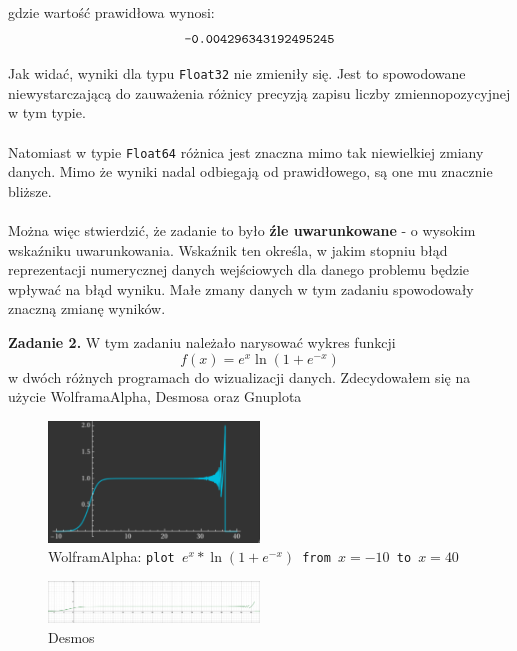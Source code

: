 \documentclass[15pt, a4paper]{article}
\begin{document}
\vspace{0.5cm}

\noindent gdzie wartość prawidłowa wynosi: \[\verb|-0.004296343192495245|\]

\noindent Jak widać, wyniki dla typu \verb|Float32| nie zmieniły się. Jest to spowodowane niewystarczającą do zauważenia różnicy precyzją zapisu liczby zmiennopozycyjnej w tym typie.\\\\
Natomiast w typie \verb|Float64| różnica jest znaczna mimo tak niewielkiej zmiany danych. Mimo że wyniki nadal odbiegają od prawidłowego, są one mu znacznie bliższe. \\\\
Można więc stwierdzić, że zadanie to było \textbf{źle uwarunkowane} - o wysokim wskaźniku uwarunkowania. Wskaźnik ten określa, w jakim stopniu błąd reprezentacji numerycznej danych wejściowych dla danego problemu będzie wpływać na błąd wyniku. Małe zmany danych w tym zadaniu spowodowały znaczną zmianę wyników. 

\vspace{0.5cm}

\pagebreak

\noindent\hrulefill


\vspace{0.5cm}

\noindent\textbf{Zadanie 2.} W tym zadaniu należało narysować wykres funkcji \[f(x) = e^{x}\ln(1 + e^{-x})\] 
w dwóch różnych programach do wizualizacji danych. Zdecydowałem się na użycie WolframaAlpha, Desmosa oraz Gnuplota

\begin{figure}[h]
    \centering
    \includegraphics[width=0.5\textwidth]{img/wolfram1.png}  
    \caption{WolframAlpha: \texttt{plot $e^{x} * \ln(1 + e^{-x})$ from $x = -10$ to $x = 40$}}
\end{figure}

\begin{figure}[h]
    \centering
    \includegraphics[width=0.5\textwidth]{img/desmos1.png}
    \caption{Desmos}
\end{figure}
\end{document}
